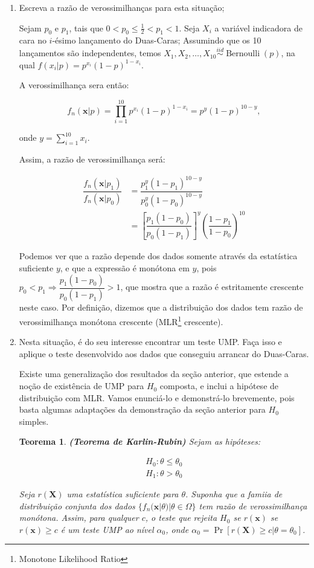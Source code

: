 \documentclass[a4paper,10pt, notitlepage]{report}
\newtheorem{teo}{Teorema}
\newcommand{\gt}{>}%
\newcommand{\pow}{^}%
\newcommand{\pr}{\operatorname{Pr}} %
\newcommand{\bX}{\boldsymbol{X}} %
\newcommand{\bx}{\boldsymbol{x}} %
\newcommand{\op}{\operatorname}
\begin{document}
	\begin{enumerate}
		\item Escreva a razão de verossimilhanças para esta situação;
		
		Sejam $p_0$ e $p_1$, tais que $0<p_0\leq \frac{1}{2}<p_1<1$. Seja $X_i$ a variável indicadora de cara no $i$-ésimo lançamento do Duas-Caras; Assumindo que os 10 lançamentos são independentes, temos $X_1,X_2,\ldots,X_{10}\stackrel{iid}{\sim} \op{Bernoulli}(p)$, na qual $f(x_i|p)=p\pow{x_i}(1-p)\pow{1-x_i}$.
		
		A verossimilhança sera então:
		
		$$f_n(\bx|p)=\prod_{i=1}^{10}p\pow{x_i}(1-p)\pow{1-x_i}=p\pow{y}(1-p)\pow{10-y},$$
		
		onde $\displaystyle y=\sum_{i=1}^{10}x_i$.
		
		Assim, a razão de verossimilhança será:
		
		\begin{align*}
			\dfrac{f_n(\bx|p_1)}{f_n(\bx|p_0)}&=\dfrac{p_1\pow{y}(1-p_1)\pow{10-y}}{p_0\pow{y}(1-p_0)\pow{10-y}}\\
			&=\left[\dfrac{p_1(1-p_0)}{p_0(1-p_1)}\right]\pow y\left(\dfrac{1-p_1}{1-p_0}\right)\pow{10}
		\end{align*}
		
		Podemos ver que a razão depende dos dados somente através da estatística suficiente $y$, e que a expressão é monótona em $y$, pois $p_0<p_1\Rightarrow \dfrac{p_1(1-p_0)}{p_0(1-p_1)}>1$, que mostra que a razão é estritamente crescente neste caso. Por definição, dizemos que a distribuição dos dados tem razão de verossimilhança monótona crescente (MLR\footnote{Monotone Likelihood Ratio} crescente).
		
		\item Nesta situação, é do seu interesse encontrar um teste UMP.
		Faça isso e aplique o teste desenvolvido aos dados que conseguiu arrancar do Duas-Caras.
		
		Existe uma generalização dos resultados da seção anterior, que estende a noção de existência de UMP para $H_0$ composta, e inclui a hipótese de distribuição com MLR. Vamos enunciá-lo e demonstrá-lo brevemente, pois basta algumas adaptações da demonstração da seção anterior para $H_0$ simples.
		
		\begin{teo}
			\textbf{(Teorema de Karlin-Rubin)} Sejam as hipóteses:
			
			\begin{align*}
				H_0:\theta\leq\theta_0\\
				H_1:\theta\gt\theta_0
			\end{align*}
			
			Seja $r(\bX)$ uma estatística suficiente para $\theta$. Suponha que a famiia de distribuição conjunta dos dados $\{f_n(\bx|\theta)|\theta\in\Omega\}$ tem razão de verossimilhança monótona. Assim, para qualquer $c$, o teste que rejeita $H_0$ se $r(\bx)$ se $r(\bx)\geq c$ é um teste UMP ao nível $\alpha_0$, onde $\alpha_0=\pr[r(\bX)\geq c|\theta=\theta_0]$.
		\end{teo} 
	
	\end{enumerate}
	
	
	
	
	
	
	
	
	
	
	
\end{document}
